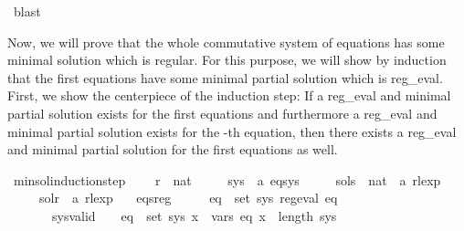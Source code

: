 \begin{isabellebody}
\ blast\isanewline
{}\isamarkupfalse%
%
\endisatagproof
{\isafoldproof}%
%
\isadelimproof
%
\endisadelimproof
%
\isadelimdocument
%
\endisadelimdocument
%
\isatagdocument
%
\isamarkuptrue%
%
\endisatagdocument
{\isafolddocument}%
%
\isadelimdocument
%
\endisadelimdocument
%
\begin{isamarkuptext}%
Now, we will prove that the whole commutative system of equations has some minimal solution
which is regular. For this purpose, we will show by induction that the first  equations have
some minimal partial solution which is reg_eval.
First, we show the centerpiece of the induction step: If a reg_eval and minimal partial solution
 exists for the first  equations and furthermore a reg_eval and minimal partial solution
 exists for the -th equation, then there exists a reg_eval and minimal partial solution
for the first  equations as well.%
\end{isamarkuptext}\isamarkuptrue%
\isamarkupfalse%
\ min{\isacharunderscore}{\kern0pt}sol{\isacharunderscore}{\kern0pt}induction{\isacharunderscore}{\kern0pt}step\ {\isacharequal}{\kern0pt}\isanewline
\ \ \ r\ {\isacharcolon}{\kern0pt}{\isacharcolon}{\kern0pt}\ nat\isanewline
\ \ \ \ \ sys\ {\isacharcolon}{\kern0pt}{\isacharcolon}{\kern0pt}\ {\isachardoublequoteopen}{\isacharprime}{\kern0pt}a\ eq{\isacharunderscore}{\kern0pt}sys{\isachardoublequoteclose}\isanewline
\ \ \ \ \ sols\ {\isacharcolon}{\kern0pt}{\isacharcolon}{\kern0pt}\ {\isachardoublequoteopen}nat\ {\isasymRightarrow}\ {\isacharprime}{\kern0pt}a\ rlexp{\isachardoublequoteclose}\isanewline
\ \ \ \ \ sol{\isacharunderscore}{\kern0pt}r\ {\isacharcolon}{\kern0pt}{\isacharcolon}{\kern0pt}\ {\isachardoublequoteopen}{\isacharprime}{\kern0pt}a\ rlexp{\isachardoublequoteclose}\isanewline
\ \ \ eqs{\isacharunderscore}{\kern0pt}reg{\isacharcolon}{\kern0pt}\ \ \ \ \ \ {\isachardoublequoteopen}{\isasymforall}eq\ {\isasymin}\ set\ sys{\isachardot}{\kern0pt}\ reg{\isacharunderscore}{\kern0pt}eval\ eq{\isachardoublequoteclose}\isanewline
\ \ \ \ \ \ \ sys{\isacharunderscore}{\kern0pt}valid{\isacharcolon}{\kern0pt}\ \ \ \ {\isachardoublequoteopen}{\isasymforall}eq\ {\isasymin}\ set\ sys{\isachardot}{\kern0pt}\ {\isasymforall}x\ {\isasymin}\ vars\ eq{\isachardot}{\kern0pt}\ x\ {\isacharless}{\kern0pt}\ length\ sys{\isachardoublequoteclose}\isanewline

\end{isabellebody}
